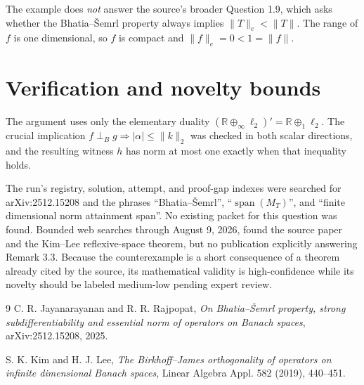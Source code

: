 \documentclass[11pt]{amsart}
\newcommand{\R}{\mathbb R}
\newcommand{\BS}{Bhatia--\v{S}emrl}
\begin{document}
The example does \emph{not} answer the source's broader Question 1.9, which
asks whether the \BS{} property always implies $\|T\|_e<\|T\|$.  The range of
$f$ is one dimensional, so $f$ is compact and $\|f\|_e=0<1=\|f\|$.

\section*{Verification and novelty bounds}

The argument uses only the elementary duality
$(\R\oplus_\infty\ell_2)'=\R\oplus_1\ell_2$.  The crucial implication
$f\perp_Bg\Rightarrow|\alpha|\leq\|k\|_2$ was checked in both scalar
directions, and the resulting witness $h$ has norm at most one exactly when
that inequality holds.

The run's registry, solution, attempt, and proof-gap indexes were searched for
arXiv:2512.15208 and the phrases ``Bhatia--\v{S}emrl'',
``$\operatorname{span}(M_T)$'', and ``finite dimensional norm attainment
span''.  No existing packet for this question was found.  Bounded web searches
through August 9, 2026, found the source paper and the Kim--Lee reflexive-space
theorem, but no publication explicitly answering Remark 3.3.  Because the
counterexample is a short consequence of a theorem already cited by the
source, its mathematical validity is high-confidence while its novelty should
be labeled medium-low pending expert review.

\begin{thebibliography}{9}
C. R. Jayanarayanan and R. R. Rajpopat,
\emph{On Bhatia--\v{S}emrl property, strong subdifferentiability and essential
norm of operators on Banach spaces}, arXiv:2512.15208, 2025.

S. K. Kim and H. J. Lee,
\emph{The Birkhoff--James orthogonality of operators on infinite dimensional
Banach spaces}, Linear Algebra Appl. 582 (2019), 440--451.
\end{thebibliography}
\end{document}
